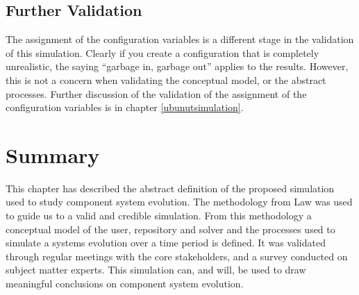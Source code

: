 \subsection{Further Validation}
The assignment of the configuration variables is a different stage in the validation of this simulation.
Clearly if you create a configuration that is completely unrealistic, the saying ``garbage in, garbage out'' applies to the results.
However, this is not a concern when validating the conceptual model, or the abstract processes.
Further discussion of the validation of the assignment of the configuration variables is in chapter \ref{ubunutsimulation}.

\section{Summary}
{}This chapter has described the abstract definition of the proposed simulation used to study component system evolution.
{}The methodology from Law \cite{Law2005} was used to guide us to a valid and credible simulation.
{}From this methodology a conceptual model of the user, repository and solver and the processes used to simulate a systems evolution over a time period is defined.
{}It was validated through regular meetings with the core stakeholders, and a survey conducted on subject matter experts.
{}This simulation can, and will, be used to draw meaningful conclusions on component system evolution.
